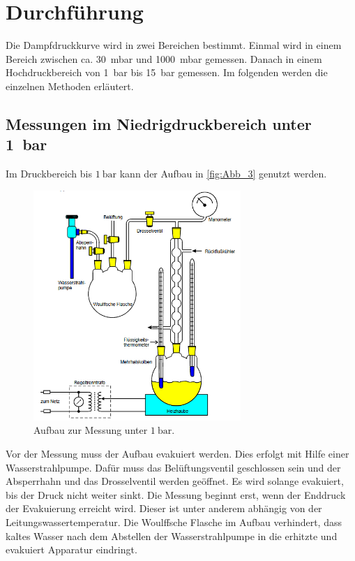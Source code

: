 \section{Durchführung}
\label{sec:Durchführung}

Die Dampfdruckkurve wird in zwei Bereichen bestimmt.
Einmal wird in einem Bereich zwischen ca. \qty{30}{\milli\bar} und \qty{1000}{\milli\bar} gemessen.
Danach in einem Hochdruckbereich von \qty{1}{\bar} bis \qty{15}{\bar} gemessen.
Im folgenden werden die einzelnen Methoden erläutert.

\subsection{Messungen im Niedrigdruckbereich unter \qty{1}{\bar}} %
\label{sub:M_Niedrigdruckbereich}
Im Druckbereich bis $\qty{1}{\bar}$ kann der Aufbau in \autoref{fig:Abb_3} genutzt werden.
\begin{figure}[H]
    \centering
    \includegraphics[width=0.7\textwidth]{build/Abb_3.PNG}
    \caption {Aufbau zur Messung unter $\qty{1}{\bar}$.\cite{v203}}
    \label{fig:Abb_3}
\end{figure}
Vor der Messung muss der Aufbau evakuiert werden.
Dies erfolgt mit Hilfe einer Wasserstrahlpumpe. Dafür muss das Belüftungsventil geschlossen sein und der Absperrhahn und das Drosselventil werden geöffnet.
Es wird solange evakuiert, bis der Druck nicht weiter sinkt. 
Die Messung beginnt erst, wenn der Enddruck der Evakuierung erreicht wird.
Dieser ist unter anderem abhängig von der Leitungswassertemperatur.
Die Woulffsche Flasche im Aufbau verhindert, dass kaltes Wasser nach dem Abstellen der Wasserstrahlpumpe in die erhitzte und evakuiert Apparatur eindringt.
